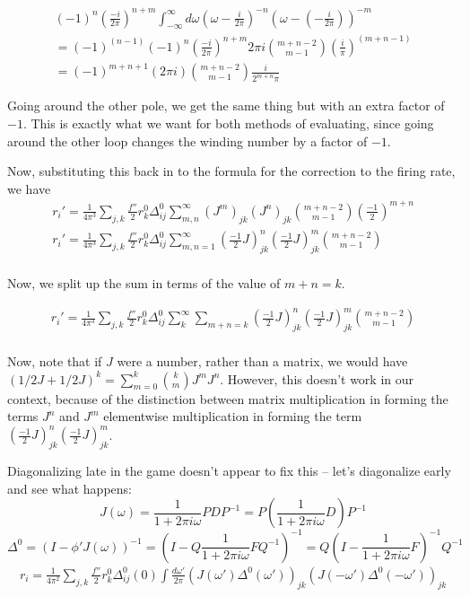 \documentclass [12pt]{amsart}
\theoremstyle{definition}
\newcommand{\inv}{^{-1}}
\begin{document}
\begin{align*}
 (-1)^n\left(\frac{-i}{2\pi}\right)^{n+m} \int_{-\infty}^\infty d\omega\left(\omega - \frac{i}{2\pi}\right)^{-n} \left(\omega - (- \frac{i}{2\pi})\right)^{-m} \\
 = (-1)^{(n-1)} (-1)^n\left(\frac{-i}{2\pi}\right)^{n+m} 2\pi i \binom{m + n -2}{m-1} \left(\frac{i}{\pi}\right)^{(m +n -1)} \\
 =(-1)^{m  + n +1} (2\pi i) \binom{m +n -2}{m-1} \frac i {2^{m+n}\pi } 
\end{align*}

Going around the other pole, we get the same thing but with an extra factor of $-1$. This is exactly what we want for both methods of evaluating, since going around the other loop changes the winding number by a factor of $-1$. 

Now, substituting this back in to the formula for the correction to the firing rate, we have 
\begin{align*}
r_i' = \frac{1}{4\pi^3} \sum_{j,k} \frac {f''}{2} r_k^0 \Delta_{ij}^0 \sum_{m,n}^\infty (J^m)_{jk} (J^n)_{jk} \binom{m  + n -2}{m-1}\left(\frac{-1}{2}\right)^{m+n}\\
r_i' = \frac{1}{4\pi^3} \sum_{j,k} \frac {f''}{2} r_k^0 \Delta_{ij}^0 \sum_{m,n =1}^\infty \left(\frac{-1}{2}J\right)^n_{jk} \left(\frac{-1}{2}J\right)_{jk}^m \binom{m  + n -2}{m-1}\\
\end{align*}

Now, we split up the sum in terms of the value of $m+n = k$.

\begin{align*}
r_i' = \frac{1}{4\pi^3} \sum_{j,k} \frac {f''}{2} r_k^0 \Delta_{ij}^0 \sum_{k}^\infty \sum_{m+n = k} \left(\frac{-1}{2}J\right)^n_{jk} \left(\frac{-1}{2}J\right)_{jk}^m \binom{m  + n -2}{m-1}\\
\end{align*}

Now, note that if $J$ were a number, rather than a matrix, we would have $(1/2 J + 1/2 J)^{k } = \sum_{m = 0}^k \binom{k}{m} J^m J^n$. However, this doesn't work in our context, because of the distinction between matrix multiplication in forming the terms $J^n$ and $J^m$ elementwise multiplication in forming the term $\left(\frac{-1}{2}J\right)^n_{jk} \left(\frac{-1}{2}J\right)_{jk}^m$. 

Diagonalizing late in the game doesn't appear to fix this -- let's diagonalize early and see what happens: $$J(\omega) = \frac{1}{1 + 2\pi i \omega} PDP\inv = P \left(  \frac{1}{1 + 2\pi i \omega} D \right) P\inv$$ $$\Delta^0 = (I - \phi' J(\omega))\inv = (I - Q \frac{1}{1 + 2\pi i \omega} F Q\inv)\inv = Q ( I -  \frac{1}{1 + 2\pi i \omega} F)\inv Q\inv $$
\begin{align*}
r_i =  \frac{1}{4\pi^2}\sum_{j,k} \frac{f''}{2} r_k^0\Delta_{ij}^0(0)\int \frac{d\omega'}{2\pi} \left(J(\omega')\Delta^0(\omega')\right)_{jk} \left(J(-\omega') \Delta^0(-\omega')\right)_{jk}
\end{align*}
\end{document}
